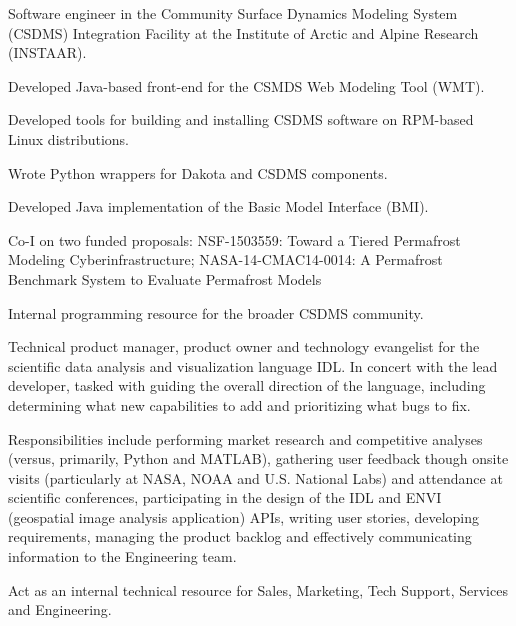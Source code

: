 \documentclass[letterpaper]{resume}
\begin{document}
\begin{compactitem}[\itembullet]
  \item Software engineer in the Community Surface Dynamics Modeling
    System (CSDMS) Integration Facility at the Institute of Arctic and
    Alpine Research (INSTAAR). 
  \item Developed Java-based front-end for the CSMDS Web Modeling Tool (WMT).
  \item Developed tools for building and installing CSDMS software on
    RPM-based Linux distributions.
  \item Wrote Python wrappers for Dakota and CSDMS components.
  \item Developed Java implementation of the Basic Model Interface (BMI).
  \item Co-I on two funded proposals: NSF-1503559: Toward a Tiered Permafrost Modeling 
    Cyberinfrastructure; NASA-14-CMAC14-0014: A Permafrost Benchmark System 
    to Evaluate Permafrost Models
  \item Internal programming resource for the broader CSDMS community.
\end{compactitem}

\begin{compactitem}[\itembullet]
  \item Technical product manager, product owner and technology
    evangelist for the scientific data analysis and visualization
    language IDL. In concert with the lead developer, tasked with
    guiding the overall direction of the language, including
    determining what new capabilities to add and prioritizing what
    bugs to fix.
  \item Responsibilities include performing market research and
    competitive analyses (versus, primarily, Python and MATLAB),
    gathering user feedback though onsite visits (particularly at
    NASA, NOAA and U.S. National Labs) and attendance at scientific
    conferences, participating in the design of the IDL and ENVI
    (geospatial image analysis application) APIs, writing user
    stories, developing requirements, managing the product backlog and
    effectively communicating information to the Engineering team.
  \item Act as an internal technical resource for Sales, Marketing,
    Tech Support, Services and Engineering.
\end{compactitem}
\end{document}
